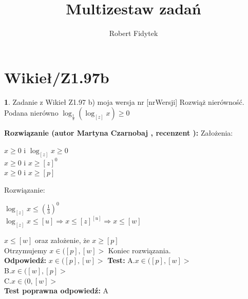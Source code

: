 \documentclass[12pt, a4paper]{article}
\title{Multizestaw zadań}
\author{Robert Fidytek}
\date{}
\theoremstyle{definition} %
\newtheorem{zad}{}
\newcommand{\kategoria}[1]{\section{#1}} %
\newcommand{\zadStart}[1]{\begin{zad}#1\newline} %
\newcommand{\zadStop}{\end{zad}}   %
\newcommand{\rozwStart}[2]{\noindent \textbf{Rozwiązanie (autor #1 , recenzent #2): }\newline} %
\newcommand{\rozwStop}{\newline}                                            %
\newcommand{\odpStart}{\noindent \textbf{Odpowiedź:}\newline}    %
\newcommand{\odpStop}{\newline}                                             %
\newcommand{\testStart}{\noindent \textbf{Test:}\newline} %
\newcommand{\testStop}{\newline} %
\newcommand{\kluczStart}{\noindent \textbf{Test poprawna odpowiedź:}\newline} %
\newcommand{\kluczStop}{\newline} %
\begin{document}
\maketitle


\kategoria{Wikieł/Z1.97b}
\zadStart{Zadanie z Wikieł Z1.97 b) moja wersja nr [nrWersji]}
Rozwiąż nierówność.\\
Podana nierówno $ \log_\frac{1}{3} (\log_{[z]} x) \ge 0 $\\
\zadStop
\rozwStart{Martyna Czarnobaj}{}
Założenia:\\
\begin{center}
	$ x \ge 0$  i  $\log_{[z]} x \ge 0 $\\
	$ x \ge 0$  i  $x \ge [z]^{0} $\\
	$ x \ge 0$  i  $ x \ge [p] $\\
\end{center}
Rozwiązanie:
\begin{center}
	$ \log_{[z]} x \le (\frac{1}{3})^{0} $\\
	$ \log_{[z]} x \le [u] \Rightarrow x \le [z]^{[u]} \Rightarrow x \le [w] $\\
\end{center}
$x \le [w]$ oraz założenie, że $ x \ge [p] $\\
Otrzymujemy $ x \in ([p],[w]> $
Koniec rozwiązania.\\
\rozwStop
\odpStart
$ x \in ([p],[w]> $
\odpStop
\testStart
A.$ x \in ([p],[w]> $\\
B.$ x \in ([w],[p]> $\\
C.$ x \in (0,[w]> $\\
\testStop
\kluczStart
A
\kluczStop
\end{document}
